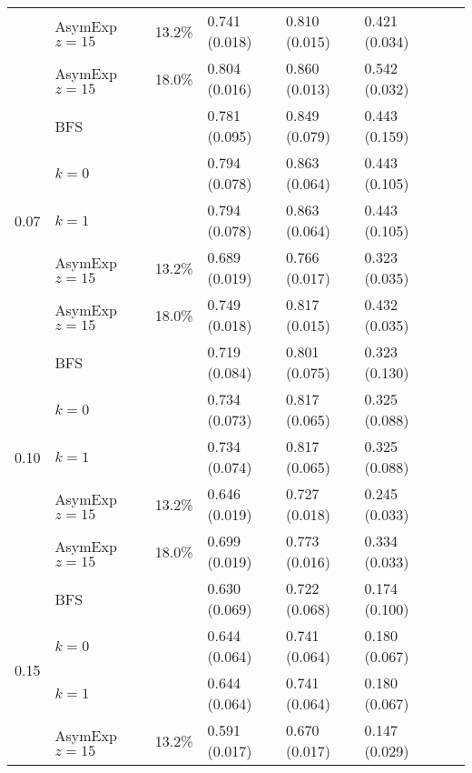 \documentclass[a4paper,final,notitlepage,11pt,svgnames]{scrartcl}
\begin{document}
\begin{table}[htpb]
\begin{tabular}{llllllll}
		                      & AsymExp $z=15$ & 13.2\%       & 0.741 (0.018) & 0.810 (0.015) & 0.421 (0.034) &              & \\
		                      & AsymExp $z=15$ & 18.0\%       & 0.804 (0.016) & 0.860 (0.013) & 0.542 (0.032) &              & \\
		\cmidrule(r){2-6}
		\multirow{5}{*}{0.07} & BFS            &              & 0.781 (0.095) & 0.849 (0.079) & 0.443 (0.159) &              & \\
		                      & $k=0$          &              & 0.794 (0.078) & 0.863 (0.064) & 0.443 (0.105) &              & \\
		                      & $k=1$          &              & 0.794 (0.078) & 0.863 (0.064) & 0.443 (0.105) &              & \\
		                      & AsymExp $z=15$ & 13.2\%       & 0.689 (0.019) & 0.766 (0.017) & 0.323 (0.035) &              & \\
		                      & AsymExp $z=15$ & 18.0\%       & 0.749 (0.018) & 0.817 (0.015) & 0.432 (0.035) &              & \\
		\cmidrule(r){2-6}
		\multirow{5}{*}{0.10} & BFS            &              & 0.719 (0.084) & 0.801 (0.075) & 0.323 (0.130) &              & \\
		                      & $k=0$          &              & 0.734 (0.073) & 0.817 (0.065) & 0.325 (0.088) &              & \\
		                      & $k=1$          &              & 0.734 (0.074) & 0.817 (0.065) & 0.325 (0.088) &              & \\
		                      & AsymExp $z=15$ & 13.2\%       & 0.646 (0.019) & 0.727 (0.018) & 0.245 (0.033) &              & \\
		                      & AsymExp $z=15$ & 18.0\%       & 0.699 (0.019) & 0.773 (0.016) & 0.334 (0.033) &              & \\
		\cmidrule(r){2-6}
		\multirow{5}{*}{0.15} & BFS            &              & 0.630 (0.069) & 0.722 (0.068) & 0.174 (0.100) &              & \\
		                      & $k=0$          &              & 0.644 (0.064) & 0.741 (0.064) & 0.180 (0.067) &              & \\
		                      & $k=1$          &              & 0.644 (0.064) & 0.741 (0.064) & 0.180 (0.067) &              & \\
		                      & AsymExp $z=15$ & 13.2\%       & 0.591 (0.017) & 0.670 (0.017) & 0.147 (0.029) &              & \\

\end{tabular}
\end{table}
\end{document}
